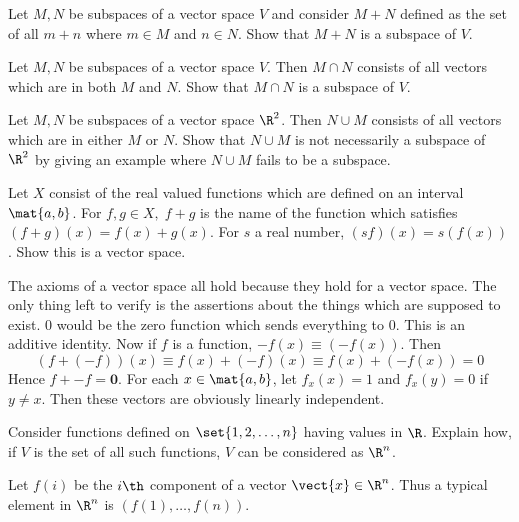 \begin{ex} Let $M,N$ be subspaces of a vector space $V$ and consider $M+N$
defined as the set of all $m+n$ where $m\in M$ and $n\in N$. Show that $M+N$
is a subspace of $V$.
\end{ex}

\begin{ex} Let $M,N$ be subspaces of a vector space $V$. Then $M\cap N$ consists
of all vectors which are in both $M$ and $N$. Show that $M\cap N$ is a
subspace of $V$.
\end{ex}

\begin{ex} Let $M,N$ be subspaces of a vector space $\R^{2}$. Then $N\cup
M$ consists of all vectors which are in either $M$ or $N$. Show that $N\cup
M $ is not necessarily a subspace of $\R^{2}$ by giving an example
where $N\cup M$ fails to be a subspace.
\end{ex}


\begin{ex} \label{4-july-prob1}Let $X$ consist of the real valued functions which
are defined on an interval $\mat{a,b}$. For $f,g\in X,\;f+g$ is the
name of the function which satisfies $(f+g) (x)
=f(x) +g(x)$. For $s$ a real number, $
(s f) (x) = s (f(x)
)$. Show this is a vector space.
\begin{sol}
The axioms of a vector space all hold because they
hold for a vector space. The only thing left to verify is the
assertions about the things which are supposed to exist. $0$ would
be the zero function which sends everything to $0$. This is an additive
identity. Now if $f$ is a function, $-f(x) \equiv (
-f(x))$. Then
\[
(f+(-f)) (x) \equiv f(x)
+(-f) (x) \equiv f(x) +(-f(
x)) =0
\]
Hence $f+-f=\mathbf{0}$. For each $x\in \mat{a,b}$, let $%
f_{x}(x) =1$ and $f_{x}(y) =0$ if $y\neq x$. Then
these vectors are obviously linearly independent.
\end{sol}
\end{ex}

\begin{ex} Consider functions defined on $\set{1,2,\ldots,n} $ having
values in $\R$. Explain how, if $V$ is the set of all such
functions, $V$ can be considered as $\R^{n}$.
\begin{sol}
Let $f(i) $ be the $i\th$ component of a vector $
\vect{x}\in \R^{n}$. Thus a typical element in $\R^{n}$ is $
(f(1) ,\ldots,f(n))$.
\end{sol}
\end{ex}

